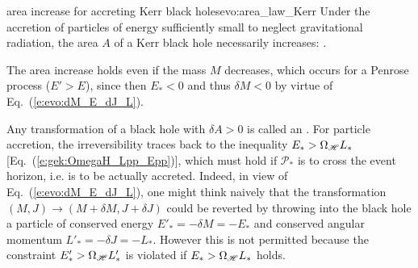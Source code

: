 \begin{tprop}{area increase for accreting Kerr black holes}{evo:area_law_Kerr}
Under the accretion of particles of energy sufficiently small to neglect
gravitational radiation, the area $A$ of a Kerr black hole
necessarily increases:
\be \label{e:evo:dA_positive_Kerr}
     .
\ee
\end{tprop}

\begin{remark}
The area increase holds even if the mass $M$ decreases, which occurs
for a Penrose process ($E'>E$), since then $E_*<0$ and thus $\delta M < 0$
by virtue of
Eq.~(\ref{e:evo:dM_E_dJ_L}).
\end{remark}


Any transformation of a black hole with $\delta A > 0$ is called an
 .
For particle accretion, the irreversibility traces back
to the inequality $E_* > \Omega_{\mathscr{H}}  L_*$ [Eq.~(\ref{e:gek:OmegaH_Lpp_Epp})],
which must hold if $\mathscr{P}_*$ is to cross the event horizon, i.e. is to be actually
accreted. Indeed, in view of Eq.~(\ref{e:evo:dM_E_dJ_L}),
one might think naively that the transformation $(M,J)\to (M+\delta M, J+\delta J)$
could be reverted by throwing into the black hole a particle of conserved energy
$E'_* = -\delta M = - E_*$
and conserved angular momentum $L'_* = -\delta J = - L_*$. However this is not permitted
because the constraint $E'_* > \Omega_{\mathscr{H}}  L'_*$ is violated if
$E_* > \Omega_{\mathscr{H}} L_*$ holds.

